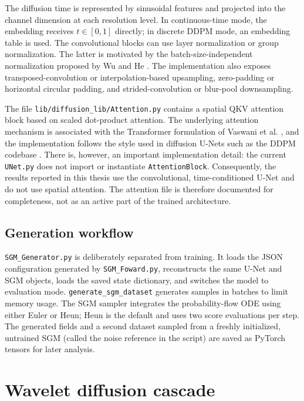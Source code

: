 The diffusion time is represented by sinusoidal features and projected into
the channel dimension at each resolution level. In continuous-time mode, the
embedding receives $t\in[0,1]$ directly; in discrete DDPM mode, an embedding
table is used. The convolutional blocks can use layer normalization or group
normalization. The latter is motivated by the batch-size-independent
normalization proposed by Wu and He \citep{wu2018groupnorm}. The implementation
also exposes transposed-convolution or interpolation-based upsampling,
zero-padding or horizontal circular padding, and strided-convolution or
blur-pool downsampling.

The file \lstinline|lib/diffusion_lib/Attention.py| contains a spatial QKV
attention block based on scaled dot-product attention. The underlying
attention mechanism is associated with the Transformer formulation of Vaswani
et al. \citep{vaswani2017attention}, and the implementation follows the style
used in diffusion U-Nets such as the DDPM codebase \citep{ho2020ddpm}. There
is, however, an important implementation detail: the current
\lstinline|UNet.py| does not import or instantiate \lstinline|AttentionBlock|.
Consequently, the results reported in this thesis use the convolutional,
time-conditioned U-Net and do not use spatial attention. The attention file is
therefore documented for completeness, not as an active part of the trained
architecture.

\subsection{Generation workflow}

\lstinline|SGM_Generator.py| is deliberately separated from training. It
loads the JSON configuration generated by \lstinline|SGM_Foward.py|,
reconstructs the same U-Net and SGM objects, loads the saved state dictionary,
and switches the model to evaluation mode. \lstinline|generate_sgm_dataset|
generates samples in batches to limit memory usage. The SGM sampler integrates
the probability-flow ODE using either Euler or Heun; Heun is the default and
uses two score evaluations per step. The generated fields and a second dataset
sampled from a freshly initialized, untrained SGM (called the noise reference
in the script) are saved as PyTorch tensors for later analysis.

\section{Wavelet diffusion cascade}

